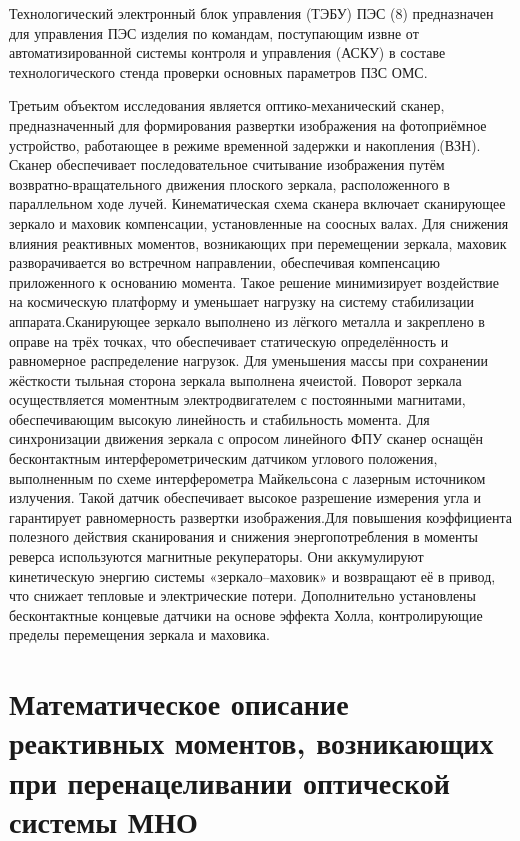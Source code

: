 Технологический электронный блок управления (ТЭБУ) ПЭС (8) предназначен для управления ПЭС изделия по командам, поступающим извне от автоматизированной системы контроля и управления (АСКУ) в составе технологического стенда проверки основных параметров ПЗС ОМС.

Третьим объектом исследования является оптико-механический сканер, предназначенный для формирования развертки изображения на фотоприёмное устройство, работающее в режиме временной задержки и накопления (ВЗН). Сканер обеспечивает последовательное считывание изображения путём возвратно-вращательного движения плоского зеркала, расположенного в параллельном ходе лучей. Кинематическая схема сканера включает сканирующее зеркало и маховик компенсации, установленные на соосных валах. Для снижения влияния реактивных моментов, возникающих при перемещении зеркала, маховик разворачивается во встречном направлении, обеспечивая компенсацию приложенного к основанию момента. Такое решение минимизирует воздействие на космическую платформу и уменьшает нагрузку на систему стабилизации аппарата.Сканирующее зеркало выполнено из лёгкого металла и закреплено в оправе на трёх точках, что обеспечивает статическую определённость и равномерное распределение нагрузок. Для уменьшения массы при сохранении жёсткости тыльная сторона зеркала выполнена ячеистой. Поворот зеркала осуществляется моментным электродвигателем с постоянными магнитами, обеспечивающим высокую линейность и стабильность момента. Для синхронизации движения зеркала с опросом линейного ФПУ сканер оснащён бесконтактным интерферометрическим датчиком углового положения, выполненным по схеме интерферометра Майкельсона с лазерным источником излучения. Такой датчик обеспечивает высокое разрешение измерения угла и гарантирует равномерность развертки изображения.Для повышения коэффициента полезного действия сканирования и снижения энергопотребления в моменты реверса используются магнитные рекуператоры. Они аккумулируют кинетическую энергию системы «зеркало–маховик» и возвращают её в привод, что снижает тепловые и электрические потери. Дополнительно установлены бесконтактные концевые датчики на основе эффекта Холла, контролирующие пределы перемещения зеркала и маховика.


\section{Математическое описание реактивных моментов, возникающих при перенацеливании оптической системы МНО}\label{sec:ch2/sec2}

